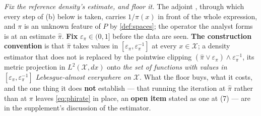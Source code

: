 \begin{definition}
\emph{Fix the reference density's estimate, and floor it.} The adjoint , through which
every step of \textup{(b)} below is taken, carries $1/\pi(x)$ in front of the whole expression, and
$\pi$ is an unknown feature of $P$ by \cref{def:spaces}; the operator the analyst forms is
 at an estimate $\hat\pi$. \textbf{Fix} $\varepsilon_\pi\in(0,1]$ before the data are
seen. \textbf{The construction convention} is that $\hat\pi$ takes values in
$[\varepsilon_\pi,\varepsilon_\pi^{-1}]$ at every $x\in\mathcal X$; a density estimator that does not
is replaced by the pointwise clipping $(\hat\pi\vee\varepsilon_\pi)\wedge\varepsilon_\pi^{-1}$, its
metric projection in $L^{2}(\mathcal X,dx)$ onto \emph{the set of functions with values in
$[\varepsilon_\pi,\varepsilon_\pi^{-1}]$ Lebesgue-almost everywhere on $\mathcal X$}. What the floor
buys, what it costs, and the one thing it does \textbf{not} establish --- that running the iteration
at $\hat\pi$ rather than at $\pi$ leaves \eqref{eq:phirate} in place, an \textbf{open item} stated as
one at \textup{(7)} --- are in the supplement's discussion of the estimator.


\end{definition}
